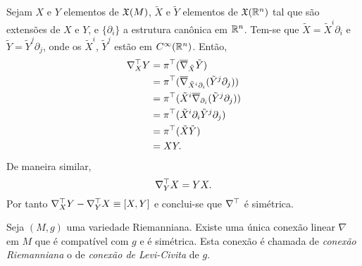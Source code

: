 \begin{demonstracao}
	Sejam $X$ e $Y$ elementos de $\mathfrak{X}(M)$, $\tilde{X}$ e $\tilde{Y}$ elementos de $\mathfrak{X}(\mathbb{R}^n)$ tal que são extensões de $X$ e $Y$, e $\{ \partial_i \}$ a estrutura canônica em $\mathbb{R}^n$. Tem-se que $\tilde{X} = \tilde{X}^i \partial_i$ e $\tilde{Y} = \tilde{Y}^j \partial_j$, onde os $\tilde{X}^i$, $\tilde{Y}^j$ estão em $C^\infty(\mathbb{R}^n)$. Então,
	\begin{align*}
		\nabla^\top_X Y &= \pi^\top (\overline{\nabla}_{\tilde{X}} \tilde{Y})\\
		&= \pi^\top (\overline{\nabla}_{\tilde{X}^i \partial_i} (\tilde{Y}^j \partial_j))\\
		&= \pi^\top (\tilde{X}^i \overline{\nabla}_{\partial_i} (\tilde{Y}^j \partial_j))\\
		&= \pi^\top (\tilde{X}^i \partial_i \tilde{Y}^j \partial_j)\\
		&= \pi^\top (\tilde{X} \tilde{Y})\\
		&= XY.
	\end{align*}
	De maneira similar,
	\begin{equation*}
		\nabla^\top_Y X = YX.
	\end{equation*}
	Por tanto $ \nabla^\top_X Y - \nabla^\top_Y X \equiv [X,Y] $ e conclui-se que $\nabla^\top$ é simétrica.
\end{demonstracao}




\begin{teorema}\label{conexao-riemanniana}
	Seja $(M,g)$ uma variedade Riemanniana. Existe uma única conexão linear $\nabla$ em $M$ que é compatível com $g$ e é simétrica.
	Esta conexão é chamada de \emph{conexão Riemanniana} o de \emph{conexão de Levi-Civita} de $g$.
\end{teorema}

